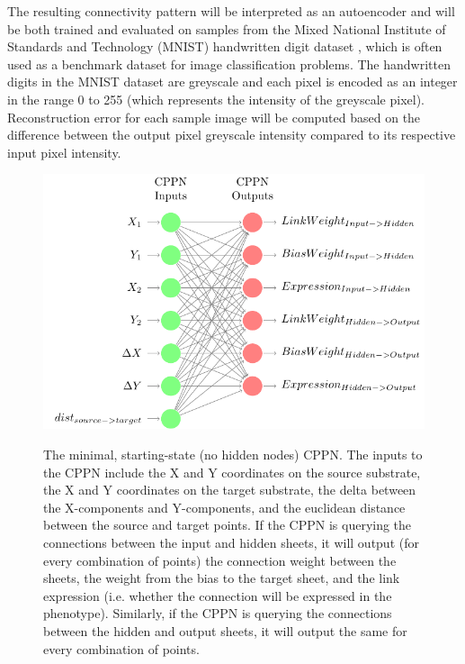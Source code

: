 \documentclass{acm_proc_article-sp}
\begin{document}
The resulting connectivity pattern will be interpreted as an autoencoder and will be both trained and evaluated on samples from the Mixed National Institute of Standards and Technology (MNIST) handwritten digit dataset \cite{mnistdataset}, which is often used as a benchmark dataset for image classification problems.  The handwritten digits in the MNIST dataset are greyscale and each pixel is encoded as an integer in the range 0 to 255 (which represents the intensity of the greyscale pixel).  Reconstruction error for each sample image will be computed based on the difference between the output pixel greyscale intensity compared to its respective input pixel intensity. 

\begin{figure}[h]
	\caption{The minimal, starting-state (no hidden nodes) CPPN.  The inputs to the CPPN include the X and Y coordinates on the source substrate, the X and Y coordinates on the target substrate, the delta between the X-components and Y-components, and the euclidean distance between the source and target points.  If the CPPN is querying the connections between the input and hidden sheets, it will output (for every combination of points) the connection weight between the sheets, the weight from the bias to the target sheet, and the link expression (i.e. whether the connection will be expressed in the phenotype).  Similarly, if the CPPN is querying the connections between the hidden and output sheets, it will output the same for every combination of points.}
	\centering
	\includegraphics[scale=0.8]{MinimalCppn/MinimalCppn}
	\label{figure:autoencodercppn}
\end{figure}
\end{document}

